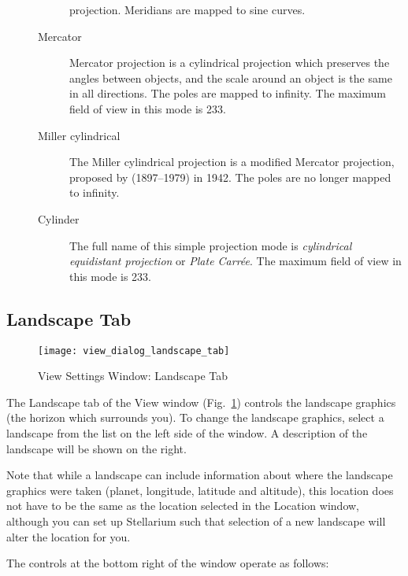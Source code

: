 \begin{description}
\begin{description}
    projection. Meridians are mapped to sine curves.
  \item[Mercator] Mercator projection is a cylindrical projection
    which preserves the angles between objects, and the scale around
    an object is the same in all directions. The poles are mapped to
    infinity.  The maximum field of view in this mode is 233\degree.
  \item[Miller cylindrical] The Miller cylindrical projection is a
    modified Mercator projection, proposed by 
    (1897--1979) in 1942. The poles are no longer mapped to
    infinity.
  \item[Cylinder] The full name of this simple projection mode is
    \emph{cylindrical equidistant projection} or \emph{Plate
      Carr\'ee}. The maximum field of view in this mode is 233\degree.
  \end{description}
\end{description}

\subsection{Landscape Tab}
\label{sec:gui:view:landscape}

\begin{figure}[t]
\centering\texttt{[image: view\_dialog\_landscape\_tab]}
\caption{View Settings Window: Landscape Tab}
\label{fig:gui:view:landscape}
\end{figure}

The Landscape tab of the View window
(Fig.~\ref{fig:gui:view:landscape}) controls the landscape graphics
(the horizon which surrounds you). To change the landscape graphics,
select a landscape from the list on the left side of the window. A
description of the landscape will be shown on the right.

Note that while a landscape  can include information about where the
landscape graphics were taken (planet, longitude, latitude and
altitude), this location does not have to be the same as the location
selected in the Location window, although you can set up Stellarium such
that selection of a new landscape will alter the location for you.

The controls at the bottom right of the window operate as follows:

